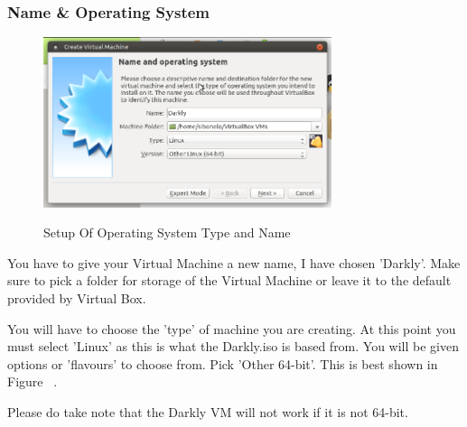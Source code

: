 \subsubsection{Name \& Operating System}
\begin{figure}[!htb]
    \centering
    \includegraphics[width=0.752\textwidth]{images/00-01.png}\\[0cm]  
    \caption[Virtual Box]{Setup Of Operating System Type and Name}
    \label{fig:00-02 - Linux Virtual Box Operating System} 
\end{figure}
You have to give your Virtual Machine a new name, I have chosen 'Darkly'. Make
sure to pick a folder for storage of the Virtual Machine or leave it to the
default provided by Virtual Box.

You will have to choose the 'type' of machine you are creating. At this point
you must select 'Linux' as this is what the Darkly.iso is based from. You will
be given options or 'flavours' to choose from. Pick 'Other 64-bit'. This is
best shown in Figure ~.

Please do take note that the Darkly VM will not work if it is not 64-bit.

